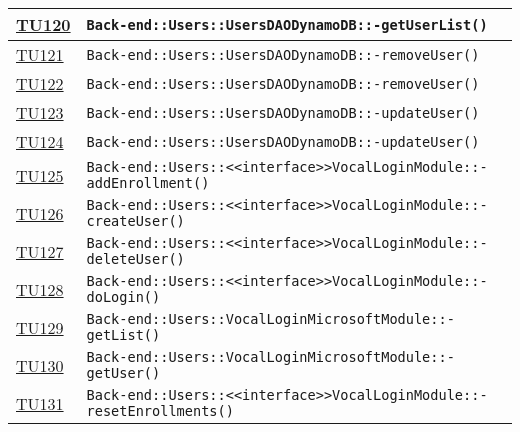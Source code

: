 \begin{longtable}{|>{\centering}m{1cm}|m{12cm}<{\centering}|}
\hyperlink{TU120}{TU120} & \texttt{Back-end::Users::UsersDAODynamoDB::-\linebreak getUserList()}\\ \hline

\hyperlink{TU121}{TU121} & \texttt{Back-end::Users::UsersDAODynamoDB::-\linebreak removeUser()}\\ \hline

\hyperlink{TU122}{TU122} & \texttt{Back-end::Users::UsersDAODynamoDB::-\linebreak removeUser()}\\ \hline

\hyperlink{TU123}{TU123} & \texttt{Back-end::Users::UsersDAODynamoDB::-\linebreak updateUser()}\\ \hline

\hyperlink{TU124}{TU124} & \texttt{Back-end::Users::UsersDAODynamoDB::-\linebreak updateUser()}\\ \hline

\hyperlink{TU125}{TU125} & \texttt{Back-end::Users::<<interface>>VocalLoginModule::-\linebreak addEnrollment()}\\ \hline

\hyperlink{TU126}{TU126} & \texttt{Back-end::Users::<<interface>>VocalLoginModule::-\linebreak createUser()}\\ \hline

\hyperlink{TU127}{TU127} & \texttt{Back-end::Users::<<interface>>VocalLoginModule::-\linebreak deleteUser()}\\ \hline

\hyperlink{TU128}{TU128} & \texttt{Back-end::Users::<<interface>>VocalLoginModule::-\linebreak doLogin()}\\ \hline

\hyperlink{TU129}{TU129} & \texttt{Back-end::Users::VocalLoginMicrosoftModule::-\linebreak getList()}\\ \hline

\hyperlink{TU130}{TU130} & \texttt{Back-end::Users::VocalLoginMicrosoftModule::-\linebreak getUser()}\\ \hline

\hyperlink{TU131}{TU131} & \texttt{Back-end::Users::<<interface>>VocalLoginModule::-\linebreak resetEnrollments()}\\ \hline


\end{longtable}
